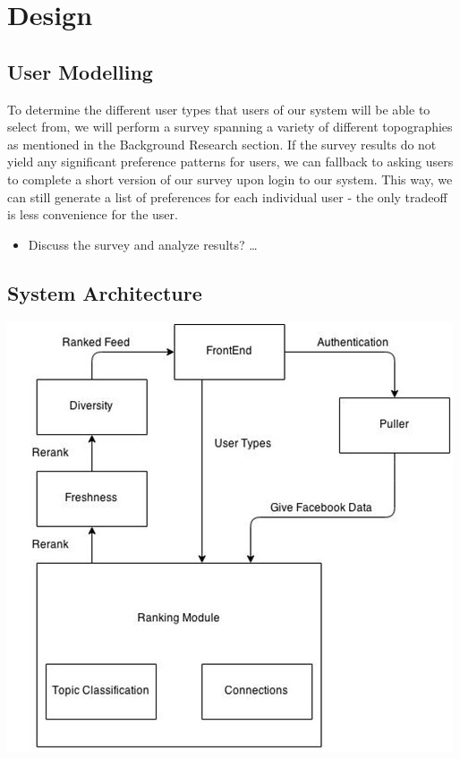 
\chapter{Design}\label{ch:design}

\section{User Modelling}

To determine the different user types that users of our system will be able to select from, we will perform a survey spanning a variety of different topographies as mentioned in the Background Research section. If the survey results do not yield any significant preference patterns for users, we can fallback to asking users to complete a short version of our survey upon login to our system. This way, we can still generate a list of preferences for each individual user - the only tradeoff is less convenience for the user.

\begin{itemize}
  \item Discuss the survey and analyze results?
\ldots
\end{itemize}

\section{System Architecture}

\begin{center}
  \includegraphics[scale=0.6]{images/blockdiagram.jpg}
\end{center}

